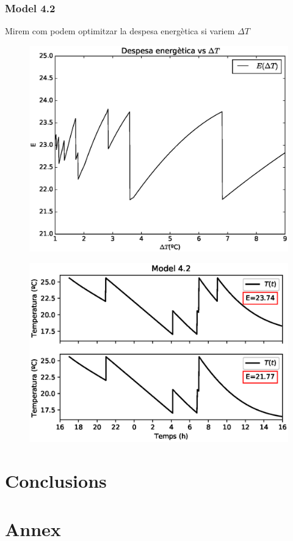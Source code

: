 \documentclass[11pt]{article}
\begin{document}
\subsubsection*{Model 4.2}
Mirem com podem optimitzar la despesa energètica si variem $\Delta T$
\begin{figure}[h!]
	\centering
	\includegraphics[width=13cm]{despesa.eps}
\end{figure}
\begin{figure}[h!]
	\centering
	\includegraphics[width=13cm]{model42.eps}
\end{figure}
\section*{Conclusions}
\section*{Annex}
\end{document}
